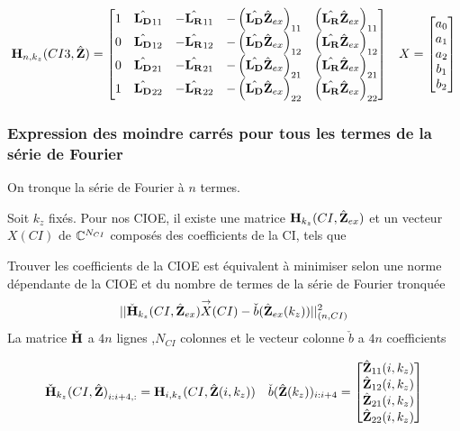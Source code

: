       \begin{align}
          \mathbf{H}_{n,k_z}(CI3,\hat{\mathbf{Z}}) = \begin{bmatrix}
          1 & \hat{\mathbf{L_D}}_{11} & -\hat{\mathbf{L_R}}_{11} & -\left(\hat{\mathbf{L_D}}\hat{\mathbf{Z}}_{ex}\right)_{11} & \left(\hat{\mathbf{L_R}}\hat{\mathbf{Z}}_{ex}\right)_{11}
          \\
          0 & \hat{\mathbf{L_D}}_{12} & -\hat{\mathbf{L_R}}_{12} & -\left(\hat{\mathbf{L_D}}\hat{\mathbf{Z}}_{ex}\right)_{12} & \left(\hat{\mathbf{L_R}}\hat{\mathbf{Z}}_{ex}\right)_{12}
          \\
          0 & \hat{\mathbf{L_D}}_{21} & -\hat{\mathbf{L_R}}_{21} & -\left(\hat{\mathbf{L_D}}\hat{\mathbf{Z}}_{ex}\right)_{21} & \left(\hat{\mathbf{L_R}}\hat{\mathbf{Z}}_{ex}\right)_{21}
          \\
          1 & \hat{\mathbf{L_D}}_{22} & -\hat{\mathbf{L_R}}_{22} & -\left(\hat{\mathbf{L_D}}\hat{\mathbf{Z}}_{ex}\right)_{22} & \left(\hat{\mathbf{L_R}}\hat{\mathbf{Z}}_{ex}\right)_{22}
          \end{bmatrix}
          && X = \begin{bmatrix} a_0 \\ a_1 \\ a_2 \\ b_1 \\ b_2 \end{bmatrix}
      \end{align}

    \subsubsection{Expression des moindre carrés pour tous les termes de la série de Fourier}

      On tronque la série de Fourier à \(n\) termes.

      \begin{prop}
        Soit \(k_z\) fixés.
        Pour nos CIOE, il existe une matrice \(\mathbf{H}_{k_z}(CI,\hat{\mathbf{Z}}_{ex})\) et un vecteur \(X(CI)\) de \(\mathbb C^{N_{CI}}\) composés des coefficients de la CI, tels que 

        Trouver les coefficients de la CIOE est équivalent à minimiser selon une norme dépendante de la CIOE et du nombre de termes de la série de Fourier tronquée
        \[ 
          || \check{\mathbf{H}}_{k_z}(CI,\hat{\mathbf{Z}}_{ex}) {\overset{\rightarrow}{X}}(CI) - \check{b}(\hat{\mathbf{Z}}_{ex}(k_z)) ||^2_{(n,CI)}
        \]
        La matrice \(\check{\mathbf{H}}\) a \(4n\) lignes ,\(N_{CI}\) colonnes et le vecteur colonne \(\check{b}\) a \(4n\) coefficients


        \begin{align}
          {\check{\mathbf{H}}_{k_z}(CI,\hat{\mathbf{Z}})}_{i:i+4,:} = \mathbf{H}_{i,k_z}(CI,\hat{\mathbf{Z}}(i,k_z))  & & \check{b}(\hat{\mathbf{Z}}(k_z))_{i:i+4} = \begin{bmatrix} \hat{\mathbf{Z}}_{11}(i,k_z) \\ \hat{\mathbf{Z}}_{12}(i,k_z)\\ \hat{\mathbf{Z}}_{21}(i,k_z) \\ \hat{\mathbf{Z}}_{22}(i,k_z) \end{bmatrix}
        \end{align}
      \end{prop}

